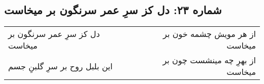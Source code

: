 \begin{center}
\section*{شماره ۲۳: دل کز سرِ عمر سرنگون بر میخاست}
\label{sec:023}
\begin{longtable}{l p{0.5cm} r}
دل کز سرِ عمر سرنگون بر میخاست
&&
از هر مویش چشمه خون بر میخاست
\\
این بلبل روح بر سرِ گلبنِ جسم
&&
از بهرِ چه مینشست چون بر میخاست
\\
\end{longtable}
\end{center}
